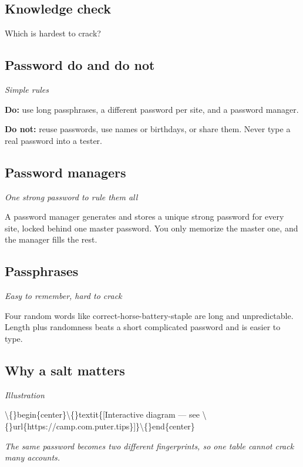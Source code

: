 \documentclass[12pt,openany]{book}
\begin{document}
\subsection*{Knowledge check}

Which is hardest to crack?

\medskip

\subsection*{Password do and do not}
{\small\itshape\color{gray}Simple rules}


\textbf{Do:} use long passphrases, a different password per site, and a password manager.

\textbf{Do not:} reuse passwords, use names or birthdays, or share them. Never type a real password into a tester.

\medskip

\subsection*{Password managers}
{\small\itshape\color{gray}One strong password to rule them all}


A password manager generates and stores a unique strong password for every site, locked behind one master password. You only memorize the master one, and the manager fills the rest.

\medskip

\subsection*{Passphrases}
{\small\itshape\color{gray}Easy to remember, hard to crack}


Four random words like correct-horse-battery-staple are long and unpredictable. Length plus randomness beats a short complicated password and is easier to type.

\medskip

\subsection*{Why a salt matters}
{\small\itshape\color{gray}Illustration}

\textbackslash\{\}begin\{center\}\textbackslash\{\}textit\{[Interactive diagram --- see \textbackslash\{\}url\{https://camp.com.puter.tips\}]\}\textbackslash\{\}end\{center\}

{\small\itshape\color{gray}The same password becomes two different fingerprints, so one table cannot crack many accounts.}
\end{document}
